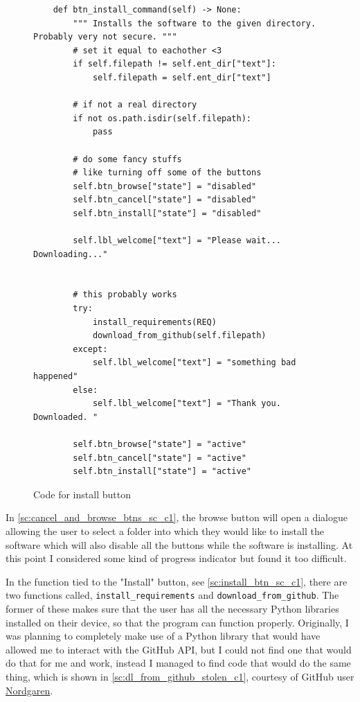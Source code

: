 \documentclass[11pt]{article}
\begin{document}
            \begin{figure}[!ht]
                \begin{verbatim}
    def btn_install_command(self) -> None:
        """ Installs the software to the given directory. Probably very not secure. """
        # set it equal to eachother <3
        if self.filepath != self.ent_dir["text"]:
            self.filepath = self.ent_dir["text"]
            
        # if not a real directory
        if not os.path.isdir(self.filepath):
            pass
        
        # do some fancy stuffs
        # like turning off some of the buttons
        self.btn_browse["state"] = "disabled"
        self.btn_cancel["state"] = "disabled"
        self.btn_install["state"] = "disabled"
        
        self.lbl_welcome["text"] = "Please wait... Downloading..."
        
        
        # this probably works
        try:
            install_requirements(REQ)
            download_from_github(self.filepath)
        except:
            self.lbl_welcome["text"] = "something bad happened"
        else:
            self.lbl_welcome["text"] = "Thank you. Downloaded. "
        
        self.btn_browse["state"] = "active"
        self.btn_cancel["state"] = "active"
        self.btn_install["state"] = "active"
                \end{verbatim}
                \caption{Code for install button}
                \label{sc:install_btn_sc_c1}
            \end{figure}


            In \autoref{sc:cancel_and_browse_btns_sc_c1}, the browse button will open a dialogue allowing the user to select a folder into which they would like to install the software which will also disable all the buttons while the software is installing. At this point I considered some kind of progress indicator but found it too difficult.


            In the function tied to the "Install" button, see \autoref{sc:install_btn_sc_c1}, there are two functions called, \verb|install_requirements| and \verb|download_from_github|. The former of these makes sure that the user has all the necessary Python libraries installed on their device, so that the program can function properly. Originally, I was planning to completely make use of a Python library that would have allowed me to interact with the GitHub API, but I could not find one that would do that for me and work, instead I managed to find code that would do the same thing, which is shown in \autoref{sc:dl_from_github_stolen_c1}, courtesy of GitHub user \href{https://github.com/Nordgaren/Github-Folder-Downloader/tree/master}{Nordgaren}.
\end{document}
